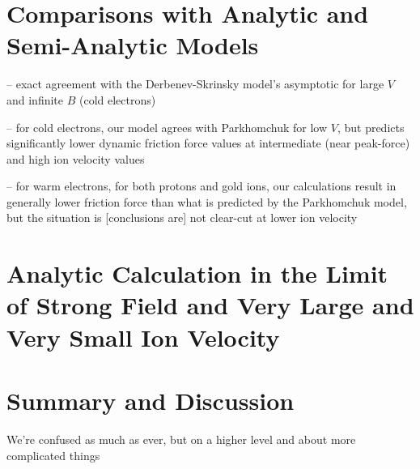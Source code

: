 \documentclass[12pt, reqno]{amsart}
\begin{document}
\section{Comparisons with Analytic and Semi-Analytic Models}

-- exact agreement with the Derbenev-Skrinsky model's asymptotic for large $V$ and infinite $B$ (cold electrons) 

-- for cold electrons, our model agrees with Parkhomchuk for low $V$, but predicts significantly lower dynamic friction force values at intermediate (near peak-force) and high ion velocity values 

 -- for warm electrons,  for both protons and gold ions, our calculations result in generally lower friction force than what is predicted by the Parkhomchuk model, but the situation is [conclusions are] not clear-cut at lower ion velocity 
 
\section{Analytic Calculation in the Limit of Strong Field and Very Large and Very Small Ion Velocity}



\section{Summary and Discussion}

We're confused as much as ever, but on a higher level and about more complicated things 
\end{document}
